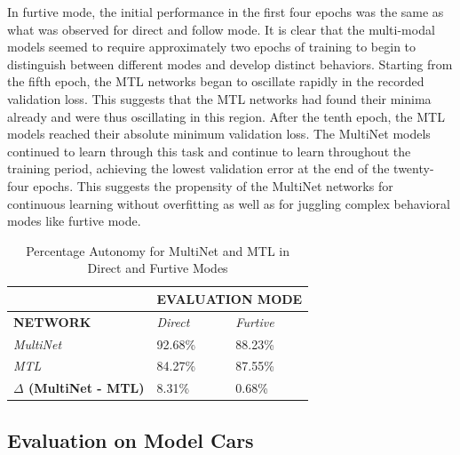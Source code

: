 In furtive mode, the initial performance in the first four epochs was the same as what was observed for direct and follow mode. It is clear that the multi-modal models seemed to require approximately two epochs of training to begin to distinguish between different modes and develop distinct behaviors. Starting from the fifth epoch, the MTL networks began to oscillate rapidly in the recorded validation loss. This suggests that the MTL networks had found their minima already and were thus oscillating in this region. After the tenth epoch, the MTL models reached their absolute minimum validation loss. The MultiNet models continued to learn through this task and continue to learn throughout the training period, achieving the lowest validation error at the end of the twenty-four epochs. This suggests the propensity of the MultiNet networks for continuous learning without overfitting as well as for juggling complex behavioral modes like furtive mode.

\begin{table}[]
\begin{center}
\begin{tabular}{l|l|l|}
\cline{2-3}
                                                         & \multicolumn{2}{l|}{\textbf{EVALUATION MODE}} \\ \hline
\multicolumn{1}{|l|}{\textbf{NETWORK}}                   & \textit{Direct}       & \textit{Furtive}      \\ \hline
\multicolumn{1}{|l|}{\textit{MultiNet}}                  & 92.68\%               & 88.23\%               \\ \hline
\multicolumn{1}{|l|}{\textit{MTL}}                       & 84.27\%               & 87.55\%               \\ \hline\hline
\multicolumn{1}{|l|}{\textbf{$\Delta$ (MultiNet - MTL)}} & 8.31\%                & 0.68\%                \\ \hline
\end{tabular}
\end{center}
\caption{Percentage Autonomy for MultiNet and MTL in Direct and Furtive Modes}
\label{resultsauto}
\end{table}

\subsection{Evaluation on Model Cars}

